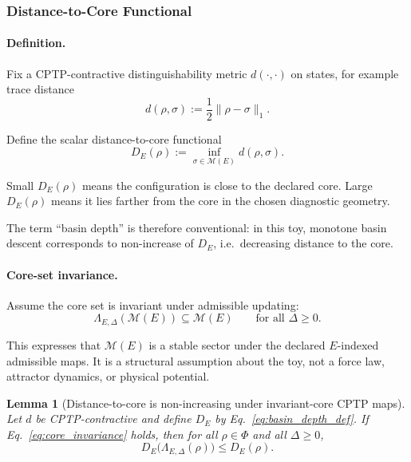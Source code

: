 \documentclass[aps,prx,onecolumn,11pt]{revtex4-2}
\theoremstyle{plain}
\newtheorem{lemma}{Lemma}
\theoremstyle{definition}
\theoremstyle{remark}
\begin{document}
\subsubsection{Distance-to-Core Functional}
\label{toy:basin_depth_functional}

\paragraph{Definition.}

Fix a CPTP-contractive distinguishability metric \(d(\cdot,\cdot)\) on
states, for example trace distance
\[
d(\rho,\sigma)
:=
\frac12\|\rho-\sigma\|_1.
\]

Define the scalar distance-to-core functional
\begin{equation}
D_E(\rho)
:=
\inf_{\sigma\in\mathcal M(E)}
d(\rho,\sigma).
\label{eq:basin_depth_def}
\end{equation}

Small \(D_E(\rho)\) means the configuration is close to the declared
core. Large \(D_E(\rho)\) means it lies farther from the core in the
chosen diagnostic geometry.

The term ``basin depth'' is therefore conventional: in this toy,
monotone basin descent corresponds to non-increase of
\(D_E\), i.e.\ decreasing distance to the core.

\paragraph{Core-set invariance.}

Assume the core set is invariant under admissible updating:
\begin{equation}
\Lambda_{E,\Delta}(\mathcal M(E))
\subseteq
\mathcal M(E)
\qquad
\text{for all }\Delta\geq 0.
\label{eq:core_invariance}
\end{equation}

This expresses that \(\mathcal M(E)\) is a stable sector under the
declared \(E\)-indexed admissible maps. It is a structural assumption
about the toy, not a force law, attractor dynamics, or physical
potential.

\begin{lemma}[Distance-to-core is non-increasing under invariant-core CPTP maps]
\label{lem:depth_nonexpansion}
Let \(d\) be CPTP-contractive and define \(D_E\) by
Eq.~\eqref{eq:basin_depth_def}. If Eq.~\eqref{eq:core_invariance}
holds, then for all \(\rho\in\Phi\) and all \(\Delta\geq 0\),
\begin{equation}
D_E\!\bigl(\Lambda_{E,\Delta}(\rho)\bigr)
\leq
D_E(\rho).
\label{eq:basin_nonexpansion}
\end{equation}
\end{lemma}
\end{document}
